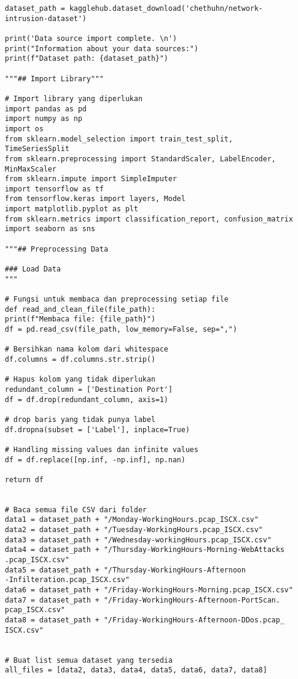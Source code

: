 \documentclass[a4paper,12pt]{report}
\begin{document}
\newpage
{}
\begin{lstlisting}
dataset_path = kagglehub.dataset_download('chethuhn/network-
intrusion-dataset')

print('Data source import complete. \n')
print("Information about your data sources:")
print(f"Dataset path: {dataset_path}")

"""## Import Library"""

# Import library yang diperlukan
import pandas as pd
import numpy as np
import os
from sklearn.model_selection import train_test_split, 
TimeSeriesSplit
from sklearn.preprocessing import StandardScaler, LabelEncoder, 
MinMaxScaler
from sklearn.impute import SimpleImputer
import tensorflow as tf
from tensorflow.keras import layers, Model
import matplotlib.pyplot as plt
from sklearn.metrics import classification_report, confusion_matrix
import seaborn as sns

"""## Preprocessing Data

### Load Data
"""

# Fungsi untuk membaca dan preprocessing setiap file
def read_and_clean_file(file_path):
print(f"Membaca file: {file_path}")
df = pd.read_csv(file_path, low_memory=False, sep=",")

# Bersihkan nama kolom dari whitespace
df.columns = df.columns.str.strip()

# Hapus kolom yang tidak diperlukan
redundant_column = ['Destination Port']
df = df.drop(redundant_column, axis=1)

# drop baris yang tidak punya label
df.dropna(subset = ['Label'], inplace=True)

# Handling missing values dan infinite values
df = df.replace([np.inf, -np.inf], np.nan)

return df


# Baca semua file CSV dari folder
data1 = dataset_path + "/Monday-WorkingHours.pcap_ISCX.csv"
data2 = dataset_path + "/Tuesday-WorkingHours.pcap_ISCX.csv"
data3 = dataset_path + "/Wednesday-workingHours.pcap_ISCX.csv"
data4 = dataset_path + "/Thursday-WorkingHours-Morning-WebAttacks
.pcap_ISCX.csv"
data5 = dataset_path + "/Thursday-WorkingHours-Afternoon
-Infilteration.pcap_ISCX.csv"
data6 = dataset_path + "/Friday-WorkingHours-Morning.pcap_ISCX.csv"
data7 = dataset_path + "/Friday-WorkingHours-Afternoon-PortScan.
pcap_ISCX.csv"
data8 = dataset_path + "/Friday-WorkingHours-Afternoon-DDos.pcap_
ISCX.csv"


# Buat list semua dataset yang tersedia
all_files = [data2, data3, data4, data5, data6, data7, data8]



\end{lstlisting}
\end{document}
